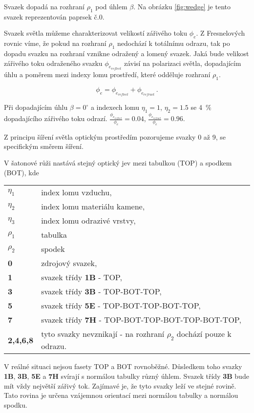Svazek dopadá na rozhraní $\rho_1$ pod úhlem $\beta$. Na obrázku \ref{fig:wedge} je tento svazek reprezentován paprsek č.0. 

Svazek světla můžeme charakterizovat velikostí zářivého toku $\phi_e$. Z Fresnelových rovnic víme, že pokud na rozhraní $\rho_1$ nedochází k totálnímu odrazu, tak po dopadu svazku na rozhraní vznikne odražený a lomený svazek. Jaká bude velikost zářivého toku odraženého svazku $\phi_{e_{reflect}}$ závisí na polarizaci světla, dopadajícím úhlu a poměrem mezi indexy lomu prostředí, které odděluje rozhraní $\rho_1$.

\begin{equation}
\phi_e = \phi_{e_{reflect}} + \phi_{e_{refract}}\,.
\end{equation}

 Při dopadajícím úhlu $\beta = 0^\circ$ a indexech lomu $\eta_1 = 1$, $\eta_2 = 1.5$ se \SI{4}{\percent} dopadajícího zářivého toku odrazí. $\frac{\phi_{e_{reflect}}}{\phi_e} = 0.04$, $\frac{\phi_{e_{refract}}}{\phi_e} = 0.96$.

Z principu šíření světla optickým prostředím pozorujeme svazky 0 až 9, se specifickým směrem šíření. 

V šatonové růži nastává stejný optický jev mezi tabulkou (TOP) a spodkem (BOT), kde
\vspace{4mm}
\begin{tabular}{p{2cm} l}
$\eta_1$ & index lomu vzduchu,\\
$\eta_2$ & index lomu materiálu kamene,\\
$\eta_3$ & index lomu odrazivé vrstvy,\\
$\rho_1$ & tabulka\\
$\rho_2$ & spodek\\
\textbf{0} & zdrojový svazek,\\
\textbf{1} & svazek třídy \textbf{1B} - TOP,\\
\textbf{3} & svazek třídy \textbf{3B} - TOP-BOT-TOP,\\
\textbf{5} & svazek třídy \textbf{5E} - TOP-BOT-TOP-BOT-TOP,\\
\textbf{7} & svazek třídy \textbf{7H} - TOP-BOT-TOP-BOT-TOP-BOT-TOP,\\
\textbf{2,4,6,8} & tyto svazky nevznikají - na rozhraní $\rho_2$ dochází pouze k odrazu.\\
\end{tabular}
\vspace{4mm}

V reálné situaci nejsou fasety TOP a BOT rovnoběžné. Důsledkem toho svazky \textbf{1B}, \textbf{3B}, \textbf{5E} a \textbf{7H} svírají s normálou tabulky různý úhlem. Svazek třídy \textbf{3B} bude mít vždy největší zářivý tok. Zajímavé je, že tyto svazky leží ve stejné rovině. Tato rovina je určena vzájemnou orientací mezi normálou tabulky a normálou spodku.

